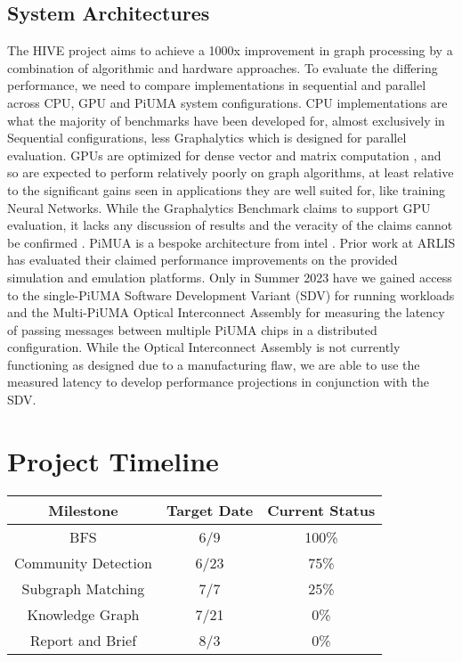 \documentclass[letterpaper, 10pt]{article}
\begin{document}
\begin{multicols}{2}
        \subsection{System Architectures}
        The HIVE project aims to achieve a 1000x improvement in graph processing by a combination of algorithmic and hardware approaches. 
        To evaluate the differing performance, we need to compare implementations in sequential and parallel across CPU, GPU and PiUMA system configurations. 
        CPU implementations are what the majority of benchmarks have been developed for, almost exclusively in Sequential configurations, less Graphalytics \cite{Capota2015} which is designed for parallel evaluation. 
        GPUs are optimized for dense vector and matrix computation \cite{Dally2021}, and so are expected to perform relatively poorly on graph algorithms, at least relative to the significant gains seen in applications they are well suited for, like training Neural Networks. While the Graphalytics Benchmark claims to support GPU evaluation, it lacks any discussion of results and the veracity of the claims cannot be confirmed \cite{Capota2015}.
        PiMUA is a bespoke architecture from intel \cite{Aananthakrishnan2020}. 
        Prior work at ARLIS has evaluated their claimed performance improvements on the provided simulation and emulation platforms. 
        Only in Summer 2023 have we gained access to the single-PiUMA Software Development Variant (SDV) for running workloads and the Multi-PiUMA Optical Interconnect Assembly for measuring the latency of passing messages between multiple PiUMA chips in a distributed configuration. 
        While the Optical Interconnect Assembly is not currently functioning as designed due to a manufacturing flaw, we are able to use the measured latency to develop performance projections in conjunction with the SDV. 
        
        
    \section{Project Timeline}
        \begin{center}
            \begin{tabular}{c|c|c}
                 Milestone  & Target Date   & Current Status  \\
                 \hline
                 BFS          & 6/9             & 100\% \\
                 Community Detection          & 6/23           & 75\% \\
                 Subgraph Matching &7/7 &25\% \\
                 Knowledge Graph &7/21 &0\% \\
                 Report and Brief &8/3 &0\%
            \end{tabular}
            \label{tab:my_label}
        \end{center}

\end{multicols}
\end{document}
